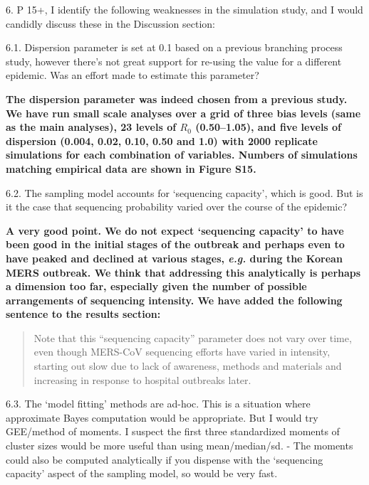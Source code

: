 \documentclass[11pt,oneside,letterpaper]{article}
\begin{document}
\textbf{}

6. P 15+, I identify the following weaknesses in the simulation study, and I would candidly discuss these in the Discussion section:

6.1. Dispersion parameter is set at 0.1 based on a previous branching process study, however there's not great support for re-using the value for a different epidemic. Was an effort made to estimate this parameter?

\textbf{The dispersion parameter was indeed chosen from a previous study. We have run small scale analyses over a grid of three bias levels (same as the main analyses), 23 levels of $R_{0}$ (0.50--1.05), and five levels of dispersion (0.004, 0.02, 0.10, 0.50 and 1.0) with 2000 replicate simulations for each combination of variables. Numbers of simulations matching empirical data are shown in Figure S15.}

6.2. The sampling model accounts for `sequencing capacity', which is good. But is it the case that sequencing probability varied over the course of the epidemic?

\textbf{A very good point. We do not expect `sequencing capacity' to have been good in the initial stages of the outbreak and perhaps even to have peaked and declined at various stages, \textit{e.g.} during the Korean MERS outbreak. We think that addressing this analytically is perhaps a dimension too far, especially given the number of possible arrangements of sequencing intensity. We have added the following sentence to the results section:}

\begin{quotation}
Note that this ``sequencing capacity'' parameter does not vary over time, even though MERS-CoV sequencing efforts have varied in intensity, starting out slow due to lack of awareness, methods and materials and increasing in response to hospital outbreaks later.
\end{quotation}

6.3. The `model fitting' methods are ad-hoc. This is a situation where approximate Bayes computation would be appropriate. But I would try GEE/method of moments. I suspect the first three standardized moments of cluster sizes would be more useful than using mean/median/sd. - The moments could also be computed analytically if you dispense with the `sequencing capacity' aspect of the sampling model, so would be very fast.
\end{document}
